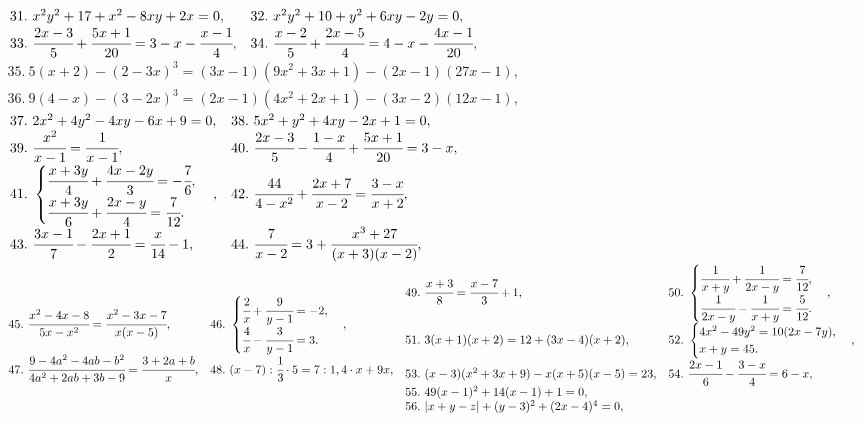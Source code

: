 $\begin{array}{ll}
31.\ x^2y^2+17+x^2-8xy+2x=0,&
32.\ x^2y^2+10+y^2+6xy-2y=0,\\
33.\ \cfrac{2x-3}{5}+\cfrac{5x+1}{20}=3-x-\cfrac{x-1}{4},&
34.\ \cfrac{x-2}{5}+\cfrac{2x-5}{4}=4-x-\cfrac{4x-1}{20},
\end{array}$\\
$\begin{array}{l}
35.\ 5(x+2)-(2-3x)^3=(3x-1)(9x^2+3x+1)-(2x-1)(27x-1),\\
36.\ 9(4-x)-(3-2x)^3=(2x-1)(4x^2+2x+1)-(3x-2)(12x-1),
\end{array}$\\
$\begin{array}{ll}
37.\ 2x^2+4y^2-4xy-6x+9=0,&
38.\ 5x^2+y^2+4xy-2x+1=0,\\
39.\ \cfrac{x^2}{x-1}=\cfrac{1}{x-1},&
40.\ \cfrac{2x-3}{5}-\cfrac{1-x}{4}+\cfrac{5x+1}{20}=3-x,\\
41.\ \begin{cases}\cfrac{x+3y}{4}+\cfrac{4x-2y}{3}=-\cfrac{7}{6},\\ \cfrac{x+3y}{6}+\cfrac{2x-y}{4}=\cfrac{7}{12}. \end{cases},&
42.\ \cfrac{44}{4-x^2}+\cfrac{2x+7}{x-2}=\cfrac{3-x}{x+2},\\
43.\ \cfrac{3x-1}{7}-\cfrac{2x+1}{2}=\cfrac{x}{14}-1,&
44.\ \cfrac{7}{x-2}=3+\cfrac{x^3+27}{(x+3)(x-2)},\end{array}$\\
$\begin{array}{ll}
45.\ \cfrac{x^2-4x-8}{5x-x^2}=\cfrac{x^2-3x-7}{x(x-5)},&
46.\ \begin{cases} \cfrac{2}{x}+\cfrac{9}{y-1}=-2,\\ \cfrac{4}{x}- \cfrac{3}{y-1}=3. \end{cases},\\
47.\ \cfrac{9-4a^2-4ab-b^2}{4a^2+2ab+3b-9}=\cfrac{3+2a+b}{x},&
48.\ (x-7): \cfrac{1}{3}\cdot 5=7: 1,4\cdot x+9x,\end{array}\\
\begin{array}{ll}
49.\ \cfrac{x+3}{8}=\cfrac{x-7}{3}+1,&
50.\ \begin{cases} \cfrac{1}{x+y}+\cfrac{1}{2x-y}=\cfrac{7}{12},\\
\cfrac{1}{2x-y}-\cfrac{1}{x+y}=\cfrac{5}{12}.\end{cases},\\
51.\ 3(x+1)(x+2)=12+(3x-4)(x+2),&
52.\ \begin{cases} 4x^2-49y^2=10(2x-7y),\\ x+y=45.\end{cases},\\
53.\ (x-3)(x^2+3x+9)-x(x+5)(x-5)=23,&
54.\ \cfrac{2x-1}{6}-\cfrac{3-x}{4}=6-x,\\
55.\ 49(x-1)^2+14(x-1)+1=0,\\
56.\ |x+y-z|+(y-3)^2+(2x-4)^4=0,\end{array}$\\
